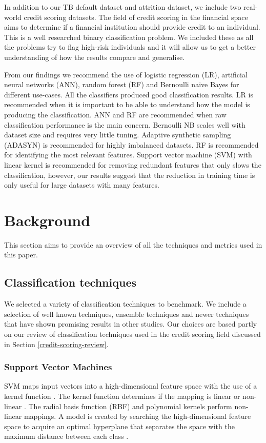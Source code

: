 \documentclass{sig-alternate-05-2015}
\begin{document}
	In addition to our TB default dataset and attrition dataset, we include two real-world credit scoring datasets. The field of credit scoring in the financial space aims to determine if a financial institution should provide credit to an individual. This is a well researched binary classification problem. We included these as all the problems try to flag high-risk individuals and it will allow us to get a better understanding of how the results compare and generalise.
	
	From our findings we recommend the use of logistic regression (LR), artificial neural networks (ANN), random forest (RF) and Bernoulli naive Bayes for different use-cases. All the classifiers produced good classification results. LR is recommended when it is important to be able to understand how the model is producing the classification. ANN and RF are recommended when raw classification performance is the main concern. Bernoulli NB scales well with dataset size and requires very little tuning. Adaptive synthetic sampling (ADASYN) is recommended for highly imbalanced datasets. RF is recommended for identifying the most relevant features. Support vector machine (SVM) with linear kernel is recommended for removing redundant features that only slows the classification, however, our results suggest that the reduction in training time is only useful for large datasets with many features.
	
	\section{Background}
	This section aims to provide an overview of all the techniques and metrics used in this paper.
	
	\subsection{Classification techniques}
	We selected a variety of classification techniques to benchmark. We include a selection of well known techniques, ensemble techniques and newer techniques that have shown promising results in other studies. Our choices are based partly on our review of classification techniques used in the credit scoring field discussed in Section \ref{credit-scoring-review}.
	\subsubsection{Support Vector Machines}
	SVM maps input vectors into a high-dimensional feature space with the use of a kernel function \cite{Danenas20153194}. The kernel function determines if the mapping is linear or non-linear \cite{Luo20097562}. The radial basis function (RBF) and polynomial kernels perform non-linear mappings. A model is created by searching the high-dimensional feature space to acquire an optimal hyperplane that separates the space with the maximum distance between each class \cite{Danenas20153194}.
	
\end{document}
